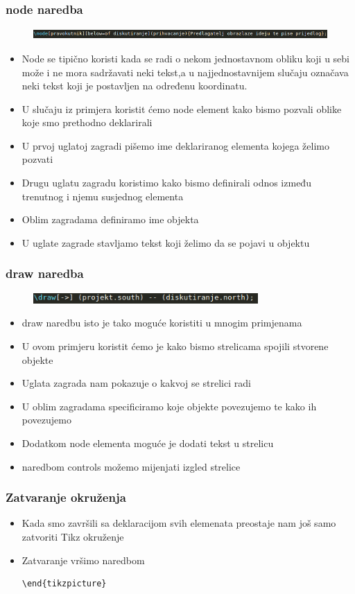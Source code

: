\documentclass{beamer}
\begin{document}
	\begin{frame}
	\frametitle{node naredba}
		\begin{figure}
			\begin{center}
				\includegraphics[width=12 cm,height=0.4cm]{Slike/node.png}
			\end{center}
		\end{figure}
		\begin{itemize}
		\item Node se tipično koristi kada se radi o nekom jednostavnom obliku koji u sebi može i ne mora sadržavati neki tekst,a u najjednostavnijem slučaju označava neki tekst koji je postavljen na određenu koordinatu.
		\item U slučaju iz primjera koristit ćemo node element kako bismo pozvali oblike koje smo prethodno deklarirali
		\item U prvoj uglatoj zagradi pišemo ime deklariranog elementa kojega želimo pozvati
		\item Drugu uglatu zagradu koristimo kako bismo definirali odnos između trenutnog i njemu susjednog elementa
		\item Oblim zagradama definiramo ime objekta
		\item U uglate zagrade stavljamo tekst koji želimo da se pojavi u objektu
  		\end{itemize}	
	\end{frame}

		\begin{frame}
	\frametitle{draw naredba}
		\begin{figure}
			\begin{center}
				\includegraphics[width=12 cm,height=0.4cm]{Slike/draw.png}
			\end{center}
		\end{figure}
		\begin{itemize}
		\item draw naredbu isto je tako moguće koristiti u mnogim primjenama
		\item U ovom primjeru koristit ćemo je kako bismo strelicama spojili stvorene objekte
		\item Uglata zagrada nam pokazuje o kakvoj se strelici radi 
		\item U oblim zagradama specificiramo koje objekte povezujemo te kako ih povezujemo
		\item Dodatkom node elementa moguće je dodati tekst u strelicu 
		\item naredbom controls možemo mijenjati izgled strelice
  		\end{itemize}	
	\end{frame}

\begin{frame}[fragile]
	\frametitle{Zatvaranje okruženja}
		\begin{itemize}
		\item Kada smo završili sa deklaracijom svih elemenata preostaje nam još samo zatvoriti Tikz okruženje
		\item Zatvaranje vršimo naredbom \begin{verbatim}\end{tikzpicture}\end{verbatim}
  		\end{itemize}	
\end{frame}	
\end{document}
